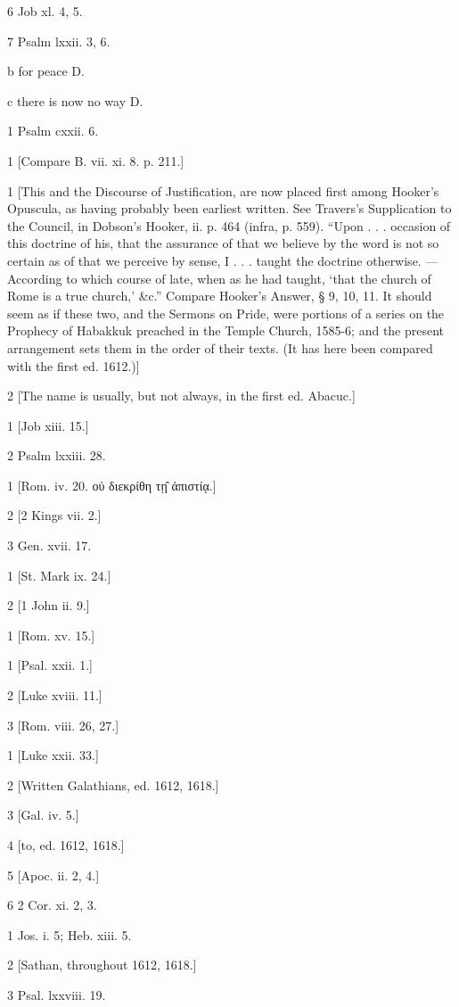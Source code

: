 6
Job xl. 4, 5.

7
Psalm lxxii. 3, 6.

b
for peace D.

c
there is now no way D.

1
Psalm cxxii. 6.

1
[Compare B. vii. xi. 8. p. 211.]

1
[This and the Discourse of Justification, are now placed first among Hooker’s Opuscula, as having probably been earliest written. See Travers’s Supplication to the Council, in Dobson’s Hooker, ii. p. 464 (infra, p. 559). “Upon . . . occasion of this doctrine of his, that the assurance of that we believe by the word is not so certain as of that we perceive by sense, I . . . taught the doctrine otherwise. — According to which course of late, when as he had taught, ‘that the church of Rome is a true church,’ &c.” Compare Hooker’s Answer, § 9, 10, 11. It should seem as if these two, and the Sermons on Pride, were portions of a series on the Prophecy of Habakkuk preached in the Temple Church, 1585-6; and the present arrangement sets them in the order of their texts. (It has here been compared with the first ed. 1612.)]

2
[The name is usually, but not always, in the first ed. Abacuc.]

1
[Job xiii. 15.]

2
Psalm lxxiii. 28.

1
[Rom. iv. 20. οὐ διεκρίθη τῃ̑ ἀπιστίᾳ.]

2
[2 Kings vii. 2.]

3
Gen. xvii. 17.

1
[St. Mark ix. 24.]

2
[1 John ii. 9.]

1
[Rom. xv. 15.]

1
[Psal. xxii. 1.]

2
[Luke xviii. 11.]

3
[Rom. viii. 26, 27.]

1
[Luke xxii. 33.]

2
[Written Galathians, ed. 1612, 1618.]

3
[Gal. iv. 5.]

4
[to, ed. 1612, 1618.]

5
[Apoc. ii. 2, 4.]

6
2 Cor. xi. 2, 3.

1
Jos. i. 5; Heb. xiii. 5.

2
[Sathan, throughout 1612, 1618.]

3
Psal. lxxviii. 19.

